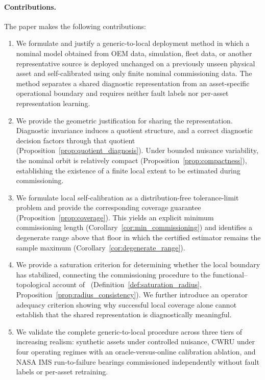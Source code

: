 \documentclass[a4paper]{cas-sc}
\begin{document}
\paragraph{Contributions.}
The paper makes the following contributions:

\begin{enumerate}

\item We formulate and justify a generic-to-local deployment method in which a
      nominal model obtained from OEM data, simulation, fleet data, or another
      representative source is deployed unchanged on a previously unseen
      physical asset and self-calibrated using only finite nominal commissioning
      data. The method separates a shared diagnostic representation from an
      asset-specific operational boundary and requires neither fault labels nor
      per-asset representation learning.

\item We provide the geometric justification for sharing the representation.
      Diagnostic invariance induces a quotient structure, and a correct
      diagnostic decision factors through that quotient
      (Proposition~\ref{prop:quotient_diagnosis}). Under bounded nuisance
      variability, the nominal orbit is relatively compact
      (Proposition~\ref{prop:compactness}), establishing the existence of a
      finite local extent to be estimated during commissioning.

\item We formulate local self-calibration as a distribution-free tolerance-limit
      problem and provide the corresponding coverage guarantee
      (Proposition~\ref{prop:coverage}). This yields an explicit minimum
      commissioning length (Corollary~\ref{cor:min_commissioning}) and
      identifies a degenerate range above that floor in which the certified
      estimator remains the sample maximum
      (Corollary~\ref{cor:degenerate_range}).

\item We provide a saturation criterion for determining whether the local
      boundary has stabilized, connecting the commissioning procedure to the
      functional--topological account of~\citet{disanti2026blueprints}
      (Definition~\ref{def:saturation_radius},
      Proposition~\ref{prop:radius_consistency}). We further introduce an
      operator adequacy criterion showing why successful local coverage alone
      cannot establish that the shared representation is diagnostically
      meaningful.

\item We validate the complete generic-to-local procedure across three tiers of
      increasing realism: synthetic assets under controlled nuisance, CWRU
      under four operating regimes with an oracle-versus-online calibration
      ablation, and NASA IMS run-to-failure bearings commissioned independently
      without fault labels or per-asset retraining.

\end{enumerate}
\end{document}
